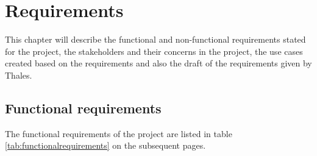 \chapter{Requirements}\label{ch:requirements}

This chapter will describe the functional and non-functional requirements stated for the project, the stakeholders and their concerns in the project, the use cases created based on the requirements and also the draft of the requirements given by Thales. 

\section{Functional requirements}
The functional requirements of the project are listed in table \ref{tab:functionalrequirements} on the subsequent pages.